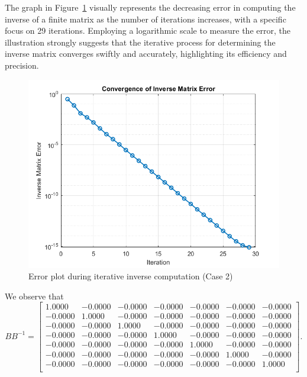 \begin{example}
The graph in Figure~\ref{graph-inverse-02} visually represents the decreasing error in computing the inverse of a finite matrix as the number of iterations increases, with a specific focus on 29 iterations. Employing a logarithmic scale to measure the error, the illustration strongly suggests that the iterative process for determining the inverse matrix converges swiftly and accurately, highlighting its efficiency and precision.

\begin{center}
    \begin{figure}[h]
        \centering
        \includegraphics[width=0.8\linewidth]{Figures/inverse_erorr_fig.png}
        \caption{Error plot during iterative inverse computation (Case 2)}
        \label{graph-inverse-02}
    \end{figure}
\end{center}


We observe that
\[B B^{-1}=
\begin{bmatrix}
    1.0000 & -0.0000 & -0.0000 & -0.0000 & -0.0000 & -0.0000 & -0.0000 \\
   -0.0000 & 1.0000 & -0.0000 & -0.0000 & -0.0000 & -0.0000 & -0.0000 \\
   -0.0000 & -0.0000 & 1.0000 & -0.0000 & -0.0000 & -0.0000 & -0.0000 \\
   -0.0000 & -0.0000 & -0.0000 & 1.0000 & -0.0000 & -0.0000 & -0.0000 \\
   -0.0000 & -0.0000 & -0.0000 & -0.0000 & 1.0000 & -0.0000 & -0.0000 \\
   -0.0000 & -0.0000 & -0.0000 & -0.0000 & -0.0000 & 1.0000 & -0.0000 \\
   -0.0000 & -0.0000 & -0.0000 & -0.0000 & -0.0000 & -0.0000 & 1.0000 \\
\end{bmatrix}.
\]
\end{example}

